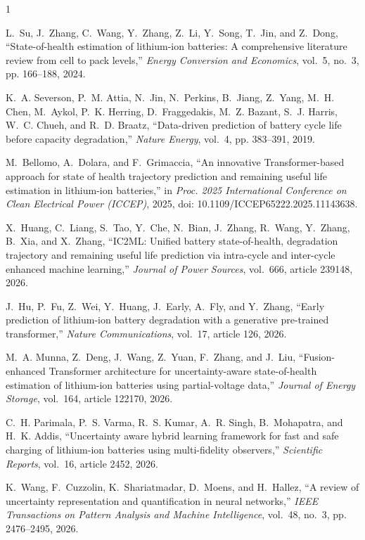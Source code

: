 \documentclass[conference]{IEEEtran}
\begin{document}

\begin{thebibliography}{1}

L.~Su, J.~Zhang, C.~Wang, Y.~Zhang, Z.~Li, Y.~Song, T.~Jin, and Z.~Dong,
``State-of-health estimation of lithium-ion batteries: A comprehensive
literature review from cell to pack levels,'' \emph{Energy Conversion and
Economics}, vol.~5, no.~3, pp. 166--188, 2024.

K.~A. Severson, P.~M. Attia, N.~Jin, N.~Perkins, B.~Jiang, Z.~Yang,
M.~H. Chen, M.~Aykol, P.~K. Herring, D.~Fraggedakis, M.~Z. Bazant,
S.~J. Harris, W.~C. Chueh, and R.~D. Braatz, ``Data-driven prediction of
battery cycle life before capacity degradation,'' \emph{Nature Energy},
vol.~4, pp. 383--391, 2019.

M.~Bellomo, A.~Dolara, and F.~Grimaccia, ``An innovative Transformer-based
approach for state of health trajectory prediction and remaining useful life
estimation in lithium-ion batteries,'' in \emph{Proc. 2025 International
Conference on Clean Electrical Power (ICCEP)}, 2025,
doi: 10.1109/ICCEP65222.2025.11143638.

X.~Huang, C.~Liang, S.~Tao, Y.~Che, N.~Bian, J.~Zhang, R.~Wang, Y.~Zhang,
B.~Xia, and X.~Zhang, ``IC2ML: Unified battery state-of-health, degradation
trajectory and remaining useful life prediction via intra-cycle and inter-cycle
enhanced machine learning,'' \emph{Journal of Power Sources}, vol.~666,
article 239148, 2026.

J.~Hu, P.~Fu, Z.~Wei, Y.~Huang, J.~Early, A.~Fly, and Y.~Zhang, ``Early
prediction of lithium-ion battery degradation with a generative pre-trained
transformer,'' \emph{Nature Communications}, vol.~17, article 126, 2026.

M.~A. Munna, Z.~Deng, J.~Wang, Z.~Yuan, F.~Zhang, and J.~Liu,
``Fusion-enhanced Transformer architecture for uncertainty-aware
state-of-health estimation of lithium-ion batteries using partial-voltage
data,'' \emph{Journal of Energy Storage}, vol.~164, article 122170, 2026.

C.~H. Parimala, P.~S. Varma, R.~S. Kumar, A.~R. Singh,
B.~Mohapatra, and H.~K. Addis, ``Uncertainty aware hybrid learning framework
for fast and safe charging of lithium-ion batteries using multi-fidelity
observers,'' \emph{Scientific Reports}, vol.~16, article 2452, 2026.

K.~Wang, F.~Cuzzolin, K.~Shariatmadar, D.~Moens, and H.~Hallez,
``A review of uncertainty representation and quantification in neural
networks,'' \emph{IEEE Transactions on Pattern Analysis and Machine
Intelligence}, vol.~48, no.~3, pp. 2476--2495, 2026.


\end{thebibliography}
\end{document}
